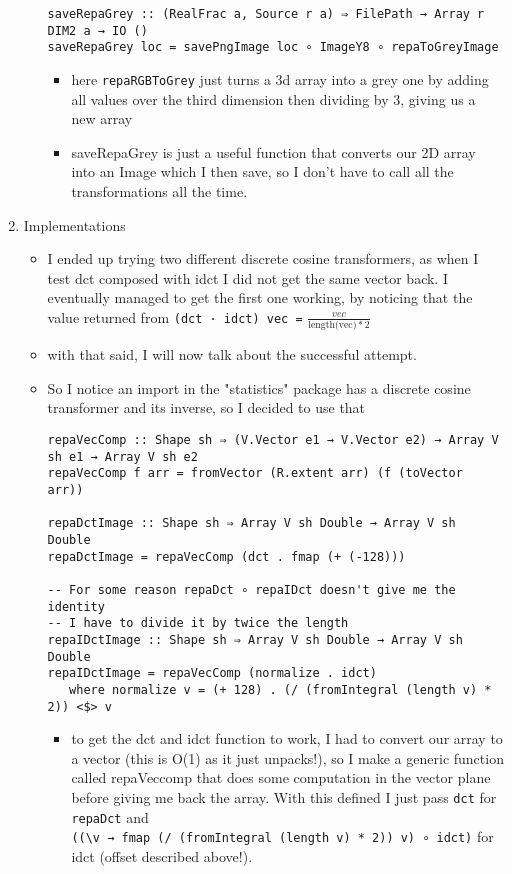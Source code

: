 \documentclass{article}
\begin{document}
\begin{enumerate}
\begin{itemize}
\begin{verbatim}
saveRepaGrey :: (RealFrac a, Source r a) ⇒ FilePath → Array r DIM2 a → IO ()
saveRepaGrey loc = savePngImage loc ∘ ImageY8 ∘ repaToGreyImage
\end{verbatim}
\begin{itemize}
\item here \texttt{repaRGBToGrey} just turns a 3d array into a grey one by
adding all values over the third dimension then dividing by 3,
giving us a new array
\item saveRepaGrey is just a useful function that converts our 2D array
into an Image which I then save, so I don't have to call all the
transformations all the time.
\end{itemize}
\end{itemize}
\item Implementations
\label{sec-1-2}
\begin{itemize}
\item I ended up trying two different discrete cosine transformers, as
when I test dct composed with idct Ι did not get the same vector
back. Ι eventually managed to get the first one working, by noticing
that the value returned from \texttt{(dct · idct) vec =} $\frac{vec}{\text{length(vec)} * 2}$
\item with that said, Ι will now talk about the successful attempt.
\item So I notice an import in the "statistics" package has a discrete
cosine transformer and its inverse, so Ι decided to use that
\begin{verbatim}
repaVecComp :: Shape sh ⇒ (V.Vector e1 → V.Vector e2) → Array V sh e1 → Array V sh e2
repaVecComp f arr = fromVector (R.extent arr) (f (toVector arr))

repaDctImage :: Shape sh ⇒ Array V sh Double → Array V sh Double
repaDctImage = repaVecComp (dct . fmap (+ (-128)))

-- For some reason repaDct ∘ repaIDct doesn't give me the identity
-- Ι have to divide it by twice the length
repaIDctImage :: Shape sh ⇒ Array V sh Double → Array V sh Double
repaIDctImage = repaVecComp (normalize . idct)
   where normalize v = (+ 128) . (/ (fromIntegral (length v) * 2)) <$> v
\end{verbatim}
\begin{itemize}
\item to get the dct and idct function to work, Ι had to convert our array
to a vector (this is O(1) as it just unpacks!), so I make a
generic function called repaVeccomp that does some computation in
the vector plane before giving me back the array. With this
defined I just pass \texttt{dct} for \texttt{repaDct} and \\ \texttt{((\textbackslash{}v → fmap (/
    (fromIntegral (length v) * 2)) v) ∘ idct)} for idct (offset
described above!).


\end{itemize}
\end{itemize}
\end{enumerate}
\end{document}

